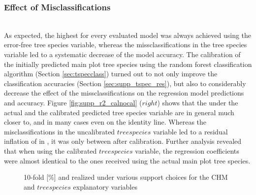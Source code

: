 \subsubsection*{Effect of Misclassifications}

\\
As expected, the highest \adjrsq{} for every evaluated model was always achieved using the error-free tree species variable, whereas the missclassifications in the tree species variable led to a systematic decrease of the model accuracy. The calibration of the initially predicted main plot tree species using the random forest classification algorithm (Section \ref{sec:tspecclass}) turned out to not only improve the classification accuracies (Section \ref{sec:supp_tspec_res}), but also to considerably decrease the effect of the missclassifications on the regression model predictions and accuracy. Figure \ref{fig:supp_r2_calnocal} ($right$) shows that the \adjrsq{} under the actual and the calibrated predicted tree species variable are in general much closer to, and in many cases even on the identity line.  Whereas the misclassifications in the uncalibrated $treespecies$ variable led to a residual inflation of  in \adjrsq{}, it was only between  after calibration. Further analysis revealed that when using the calibrated $treespecies$ variable, the regression coefficients were almost identical to the ones received using the actual main plot tree species.

\begin{figure}[h]
	\centering
	\caption{10-fold \rmsecv{}[\%] and \adjrsq{} realized under various support choices for the CHM and $tree species$ explanatory variables}
	\label{fig:supp_perf_res}
\end{figure}


